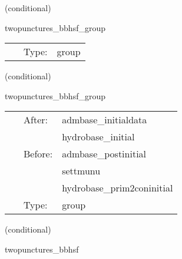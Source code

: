    (conditional) 

\hspace{5mm} twopunctures\_bbhsf\_group 

\hspace{5mm}{\it twopunctures initial data group } 


\hspace{5mm}

 \begin{tabular*}{160mm}{cll} 
~ & Type:  & group \\ 
\end{tabular*} 


\vspace{5mm}

   (conditional) 

\hspace{5mm} twopunctures\_bbhsf\_group 

\hspace{5mm}{\it twopunctures initial data group } 


\hspace{5mm}

 \begin{tabular*}{160mm}{cll} 
~ & After:  & admbase\_initialdata \\ 
~& ~ &hydrobase\_initial\\ 
~ & Before:  & admbase\_postinitial \\ 
~& ~ &settmunu\\ 
~& ~ &hydrobase\_prim2coninitial\\ 
~ & Type:  & group \\ 
\end{tabular*} 


\vspace{5mm}

   (conditional) 

\hspace{5mm} twopunctures\_bbhsf 

\hspace{5mm}{\it create puncture black hole initial data } 


\hspace{5mm}

